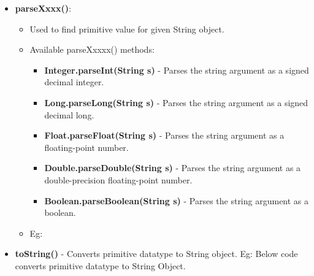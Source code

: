 \begin{flushleft}
\begin{itemize}
		\item \textbf{parseXxxx()}:
		\begin{itemize}
			\item Used to find primitive value for given String object.
			\item Available parseXxxxx() methods:
			\begin{itemize}
				\item \textbf{Integer.parseInt(String s)} - Parses the string argument as a signed decimal integer.
				\item \textbf{Long.parseLong(String s)} - Parses the string argument as a signed decimal long.
				\item \textbf{Float.parseFloat(String s)} - Parses the string argument as a floating-point number.
				\item \textbf{Double.parseDouble(String s)} - Parses the string argument as a double-precision floating-point number.
				\item \textbf{Boolean.parseBoolean(String s)} - Parses the string argument as a boolean.
			\end{itemize}
			\item Eg:
			
		\end{itemize}
		\newpage
		\item \textbf{toString()} - Converts primitive datatype to String object.
		\newline
		Eg: Below code converts primitive datatype to String Object.
		
	\end{itemize}
\end{flushleft}

\newpage